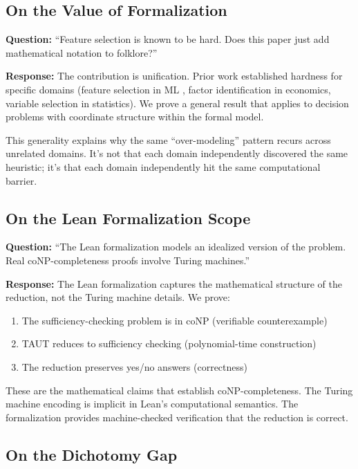 \subsection{On the Value of Formalization}

\textbf{Question:} ``Feature selection is known to be hard. Does this paper just add mathematical notation to folklore?''

\textbf{Response:} The contribution is unification. Prior work established hardness for specific domains (feature selection in ML \cite{guyon2003introduction}, factor identification in economics, variable selection in statistics). We prove a general result that applies to decision problems with coordinate structure within the formal model.

This generality explains why the same ``over-modeling'' pattern recurs across unrelated domains. It's not that each domain independently discovered the same heuristic; it's that each domain independently hit the same computational barrier.

\subsection{On the Lean Formalization Scope}

\textbf{Question:} ``The Lean formalization models an idealized version of the problem. Real coNP-completeness proofs involve Turing machines.''

\textbf{Response:} The Lean formalization captures the mathematical structure of the reduction, not the Turing machine details. We prove:

\begin{enumerate}
\item The sufficiency-checking problem is in coNP (verifiable counterexample)
\item TAUT reduces to sufficiency checking (polynomial-time construction)
\item The reduction preserves yes/no answers (correctness)
\end{enumerate}

These are the mathematical claims that establish coNP-completeness. The Turing machine encoding is implicit in Lean's computational semantics. The formalization provides machine-checked verification that the reduction is correct.

\subsection{On the Dichotomy Gap}

